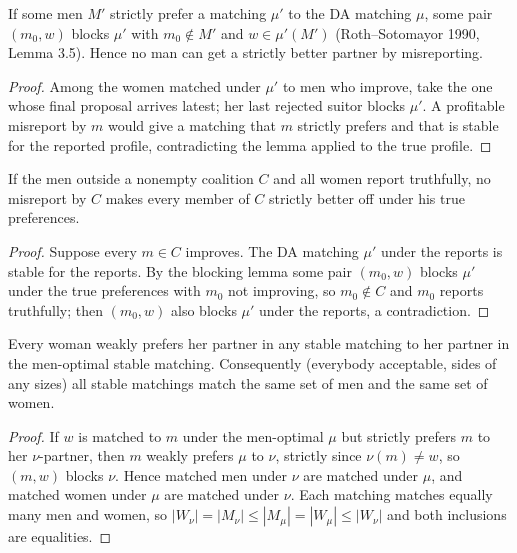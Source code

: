\begin{theorem}
\label{thm:da-strategyproof}
\leanok
{}
If some men $M'$ strictly prefer a matching $\mu'$ to the DA matching $\mu$, some pair $(m_0, w)$ blocks $\mu'$ with
$m_0 \notin M'$ and $w \in \mu'(M')$ (Roth--Sotomayor 1990, Lemma 3.5). Hence no man can get a strictly better partner by misreporting.
\end{theorem}
\begin{proof}
\leanok
Among the women matched under $\mu'$ to men who improve, take the one whose final proposal arrives latest; her
last rejected suitor blocks $\mu'$. A profitable misreport by $m$ would give a matching that $m$ strictly prefers
and that is stable for the reported profile, contradicting the lemma applied to the true profile.
\end{proof}


\begin{theorem}
\label{thm:da-group-strategyproof}
\leanok
{}
If the men outside a nonempty coalition $C$ and all women report truthfully, no misreport by $C$ makes
every member of $C$ strictly better off under his true preferences.
\end{theorem}
\begin{proof}
\leanok
Suppose every $m\in C$ improves. The DA matching $\mu'$ under the reports is stable for the reports. By the blocking
lemma some pair $(m_0,w)$ blocks $\mu'$ under the true preferences with $m_0$ not improving, so $m_0\notin C$ and
$m_0$ reports truthfully; then $(m_0,w)$ also blocks $\mu'$ under the reports, a contradiction.
\end{proof}


\begin{theorem}
\label{thm:rural-hospitals}
\leanok
{}
Every woman weakly prefers her partner in any stable matching to her partner in the men-optimal
stable matching. Consequently (everybody acceptable, sides of any sizes) all stable matchings match
the same set of men and the same set of women.
\end{theorem}
\begin{proof}
\leanok
If $w$ is matched to $m$ under the men-optimal $\mu$ but strictly prefers $m$ to her $\nu$-partner,
then $m$ weakly prefers $\mu$ to $\nu$, strictly since $\nu(m)\ne w$, so $(m,w)$ blocks $\nu$.
Hence matched men under $\nu$ are matched under $\mu$, and matched women under $\mu$ are matched
under $\nu$. Each matching matches equally many men and women, so
$|W_\nu|=|M_\nu|\le|M_\mu|=|W_\mu|\le|W_\nu|$ and both inclusions are equalities.
\end{proof}

